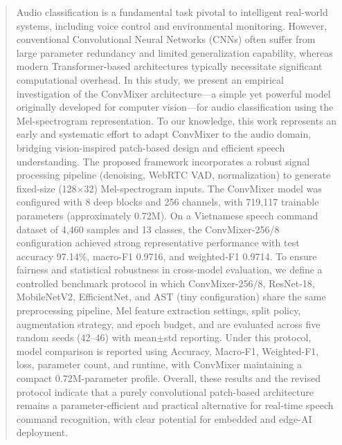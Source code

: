 \begin{abstract}

Audio classification is a fundamental task pivotal to intelligent real-world systems, including voice control and environmental monitoring. However, conventional Convolutional Neural Networks (CNNs) often suffer from large parameter redundancy and limited generalization capability, whereas modern Transformer-based architectures typically necessitate significant computational overhead.
In this study, we present an empirical investigation of the ConvMixer architecture—a simple yet powerful model originally developed for computer vision—for audio classification using the Mel-spectrogram representation.
To our knowledge, this work represents an early and systematic effort to adapt ConvMixer to the audio domain, bridging vision-inspired patch-based design and efficient speech understanding.
The proposed framework incorporates a robust signal processing pipeline (denoising, WebRTC VAD, normalization) to generate fixed-size (128×32) Mel-spectrogram inputs. The ConvMixer model was configured with 8 deep blocks and 256 channels, with 719,117 trainable parameters (approximately 0.72M).
On a Vietnamese speech command dataset of 4,460 samples and 13 classes, the ConvMixer-256/8 configuration achieved strong representative performance with test accuracy 97.14\%, macro-F1 0.9716, and weighted-F1 0.9714. To ensure fairness and statistical robustness in cross-model evaluation, we define a controlled benchmark protocol in which ConvMixer-256/8, ResNet-18, MobileNetV2, EfficientNet, and AST (tiny configuration) share the same preprocessing pipeline, Mel feature extraction settings, split policy, augmentation strategy, and epoch budget, and are evaluated across five random seeds (42--46) with mean$\pm$std reporting. Under this protocol, model comparison is reported using Accuracy, Macro-F1, Weighted-F1, loss, parameter count, and runtime, with ConvMixer maintaining a compact 0.72M-parameter profile.
Overall, these results and the revised protocol indicate that a purely convolutional patch-based architecture remains a parameter-efficient and practical alternative for real-time speech command recognition, with clear potential for embedded and edge-AI deployment.

\end{abstract}
